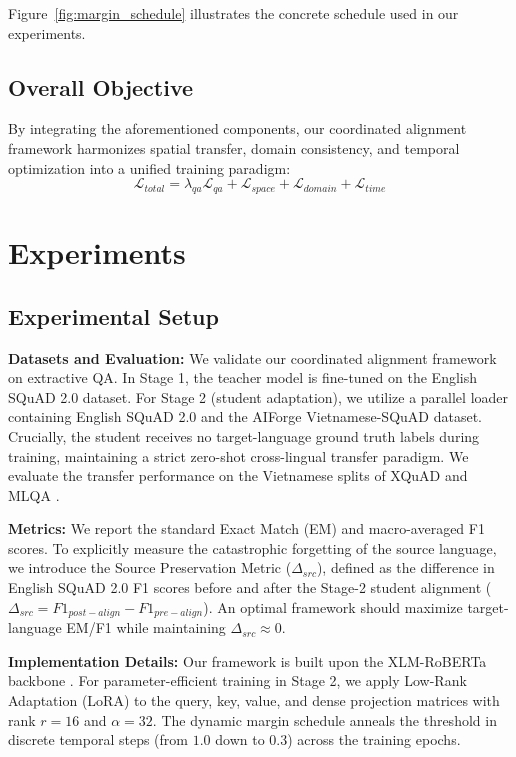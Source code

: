 \documentclass[11pt]{article}
\begin{document}
Figure~\ref{fig:margin_schedule} illustrates the concrete schedule used in our experiments.

\subsection{Overall Objective}
By integrating the aforementioned components, our coordinated alignment framework harmonizes spatial transfer, domain consistency, and temporal optimization into a unified training paradigm:
$$ \mathcal{L}_{total} = \lambda_{qa}\mathcal{L}_{qa} + \mathcal{L}_{space} + \mathcal{L}_{domain} + \mathcal{L}_{time} $$

\section{Experiments}

\subsection{Experimental Setup}
\label{sec:setup}
\textbf{Datasets and Evaluation:} We validate our coordinated alignment framework on extractive QA. In Stage 1, the teacher model is fine-tuned on the English SQuAD 2.0 dataset. For Stage 2 (student adaptation), we utilize a parallel loader containing English SQuAD 2.0 and the AIForge Vietnamese-SQuAD dataset. Crucially, the student receives no target-language ground truth labels during training, maintaining a strict zero-shot cross-lingual transfer paradigm. We evaluate the transfer performance on the Vietnamese splits of XQuAD \cite{artetxe-etal-2020-cross} and MLQA \cite{lewis-etal-2020-mlqa}. 

\textbf{Metrics:} We report the standard Exact Match (EM) and macro-averaged F1 scores. To explicitly measure the catastrophic forgetting of the source language, we introduce the Source Preservation Metric ($\Delta_{src}$), defined as the difference in English SQuAD 2.0 F1 scores before and after the Stage-2 student alignment ($\Delta_{src} = F1_{post-align} - F1_{pre-align}$). An optimal framework should maximize target-language EM/F1 while maintaining $\Delta_{src} \approx 0$.

\textbf{Implementation Details:} Our framework is built upon the XLM-RoBERTa backbone \cite{conneau-etal-2020-unsupervised}. For parameter-efficient training in Stage 2, we apply Low-Rank Adaptation (LoRA) \cite{hu2021loralowrankadaptationlarge} to the query, key, value, and dense projection matrices with rank $r=16$ and $\alpha=32$. The dynamic margin schedule anneals the threshold in discrete temporal steps (from $1.0$ down to $0.3$) across the training epochs. 
\end{document}
